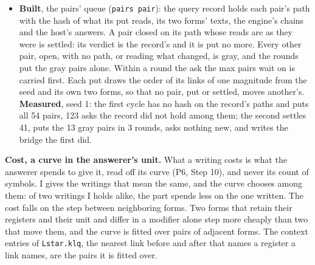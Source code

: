 \begin{itemize}
\item \textbf{Built}, the pairs' queue (\texttt{pairs pair}): the query record holds each pair's path with the hash of what its put reads, its two forms' texts, the engine's chains and the host's answers. A pair closed on its path whose reads are as they were is settled: its verdict is the record's and it is put no more. Every other pair, open, with no path, or reading what changed, is gray, and the rounds put the gray pairs alone. Within a round the ask the max pairs wait on is carried first. Each put draws the order of its links of one magnitude from the seed and its own two forms, so that no pair, put or settled, moves another's. \textbf{Measured}, seed 1: the first cycle has no hash on the record's paths and puts all 54 pairs, 123 asks the record did not hold among them; the second settles 41, puts the 13 gray pairs in 3 rounds, asks nothing new, and writes the bridge the first did.
\end{itemize}

\textbf{Cost, a curve in the answerer's unit.} What a writing costs is what the answerer spends to give it, read off its curve (P6, Step 10), and never its count of symbols. I gives the writings that mean the same, and the curve chooses among them: of two writings I holds alike, the part spends less on the one written. The cost falls on the step between neighboring forms. Two forms that retain their registers and their unit and differ in a modifier alone step more cheaply than two that move them, and the curve is fitted over pairs of adjacent forms. The context entries of \texttt{Lstar.\allowbreak{}klq}, the nearest link before and after that names a register a link names, are the pairs it is fitted over.

